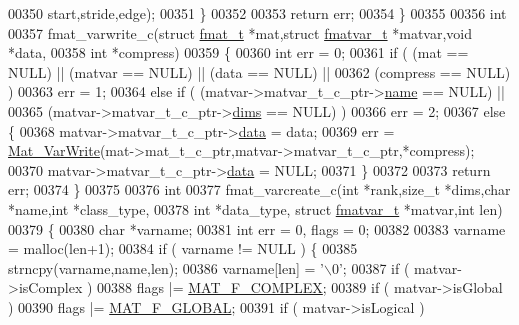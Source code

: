 \begin{DoxyCode}
{{00350                                start,stride,edge);
00351     \}
00352 
00353     \textcolor{keywordflow}{return} err;
00354 \}
00355 
00356 \textcolor{keywordtype}{int}
00357 fmat\_varwrite\_c(\textcolor{keyword}{struct} \hyperlink{structfmat__t}{fmat\_t} *mat,\textcolor{keyword}{struct} \hyperlink{structfmatvar__t}{fmatvar\_t} *matvar,\textcolor{keywordtype}{void} *data,
00358     \textcolor{keywordtype}{int} *compress)
00359 \{
00360     \textcolor{keywordtype}{int} err = 0;
00361     \textcolor{keywordflow}{if} ( (mat == NULL) || (matvar == NULL) || (data == NULL) ||
00362          (compress == NULL) )
00363         err =  1;
00364     \textcolor{keywordflow}{else} \textcolor{keywordflow}{if} ( (matvar->matvar\_t\_c\_ptr->\hyperlink{group___m_a_t_a5d4b55b041e3b4fb50c04337f05ad909}{name} == NULL) ||
00365               (matvar->matvar\_t\_c\_ptr->\hyperlink{group___m_a_t_a8e01234e1c862ce3472bb37f5a09b92c}{dims} == NULL) )
00366         err = 2;
00367     \textcolor{keywordflow}{else} \{
00368         matvar->matvar\_t\_c\_ptr->\hyperlink{group___m_a_t_a5672978efa230bbdecdf38ede781f7fa}{data} = data;
00369         err = \hyperlink{group___m_a_t_ga4bd3eba12df415d8226e27c457fbbb0b}{Mat\_VarWrite}(mat->mat\_t\_c\_ptr,matvar->matvar\_t\_c\_ptr,*compress);
00370         matvar->matvar\_t\_c\_ptr->\hyperlink{group___m_a_t_a5672978efa230bbdecdf38ede781f7fa}{data} = NULL;
00371     \}
00372 
00373     \textcolor{keywordflow}{return} err;
00374 \}
00375 
00376 \textcolor{keywordtype}{int}
00377 fmat\_varcreate\_c(\textcolor{keywordtype}{int} *rank,\textcolor{keywordtype}{size\_t} *dims,\textcolor{keywordtype}{char} *name,\textcolor{keywordtype}{int} *class\_type,
00378     \textcolor{keywordtype}{int} *data\_type, \textcolor{keyword}{struct} \hyperlink{structfmatvar__t}{fmatvar\_t} *matvar,\textcolor{keywordtype}{int} len)
00379 \{
00380     \textcolor{keywordtype}{char} *varname;
00381     \textcolor{keywordtype}{int} err = 0, flags = 0;
00382 
00383     varname = malloc(len+1);
00384     \textcolor{keywordflow}{if} ( varname != NULL ) \{
00385         strncpy(varname,name,len);
00386         varname[len] = \textcolor{charliteral}{'\(\backslash\)0'};
00387         \textcolor{keywordflow}{if} ( matvar->isComplex )
00388             flags |= \hyperlink{group___m_a_t_ggab9d6ef9e3ddca78a317b173f01d53fbbacd7b091a11184aad7fc6078c04470780}{MAT\_F\_COMPLEX};
00389         \textcolor{keywordflow}{if} ( matvar->isGlobal )
00390             flags |= \hyperlink{group___m_a_t_ggab9d6ef9e3ddca78a317b173f01d53fbba49084e0c796aa7963e53f7539525d40d}{MAT\_F\_GLOBAL};
00391         \textcolor{keywordflow}{if} ( matvar->isLogical )
}}
\end{DoxyCode}
